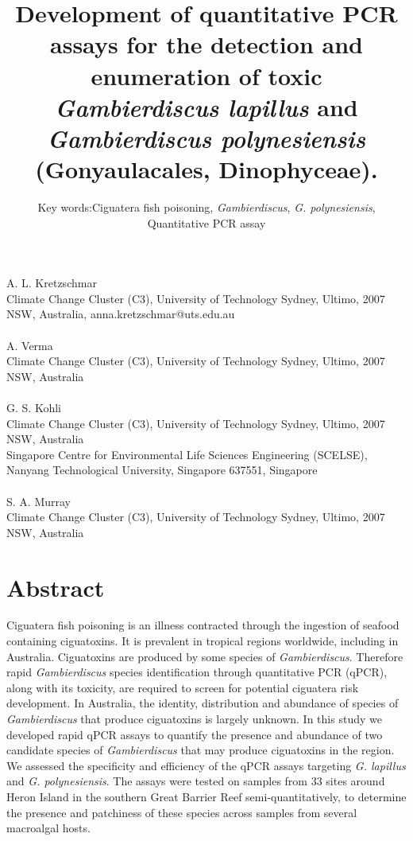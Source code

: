 \documentclass[12pt]{article}
\title{Development of quantitative PCR assays for the detection and enumeration of toxic \emph{Gambierdiscus lapillus} and \emph{Gambierdiscus polynesiensis} (Gonyaulacales, Dinophyceae).}
\author{Key words:Ciguatera fish poisoning, \emph{Gambierdiscus}, \emph{G. polynesiensis},\\
 Quantitative PCR assay}
\date{}
\begin{document}
\maketitle
\paragraph{}A. L. Kretzschmar\\
Climate Change Cluster (C3), University of Technology Sydney, Ultimo, 2007 NSW, Australia, anna.kretzschmar@uts.edu.au
\paragraph{}A. Verma \\
Climate Change Cluster (C3), University of Technology Sydney, Ultimo, 2007 NSW, Australia
\paragraph{}G. S. Kohli\\
Climate Change Cluster (C3), University of Technology Sydney, Ultimo, 2007 NSW, Australia\\
Singapore Centre for Environmental Life Sciences Engineering (SCELSE), Nanyang Technological University, Singapore 637551, Singapore
\paragraph{}S. A. Murray\\
Climate Change Cluster (C3), University of Technology Sydney, Ultimo, 2007 NSW, Australia
\newpage
\section*{Abstract}
Ciguatera fish poisoning is an illness contracted through the ingestion of seafood containing ciguatoxins. It is prevalent in tropical regions worldwide, including in Australia. Ciguatoxins are produced by some species of \emph{Gambierdiscus}. Therefore rapid \emph{Gambierdiscus} species identification through quantitative PCR (qPCR), along with its toxicity, are required to screen for potential ciguatera risk development. In Australia, the identity, distribution and abundance of species of \textit{Gambierdiscus} that produce ciguatoxins is largely unknown. In this study we developed rapid qPCR assays to quantify the presence and abundance of two candidate species of \textit{Gambierdiscus} that may produce ciguatoxins in the region. %
We assessed the specificity and efficiency of the  qPCR assays targeting \textit{G. lapillus} and \textit{G. polynesiensis}. The assays were tested on samples from 33 sites around Heron Island in the southern Great Barrier Reef semi-quantitatively, to determine the presence and patchiness of these species across samples from several macroalgal hosts.  
\end{document}
